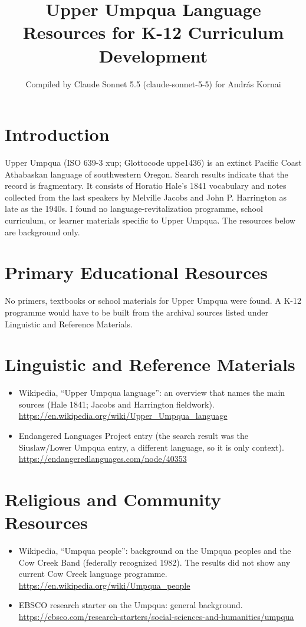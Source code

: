 \documentclass[12pt]{article}
\title{Upper Umpqua Language Resources for K-12 Curriculum Development}
\author{Compiled by Claude Sonnet 5.5 (claude-sonnet-5-5) for Andr\'as Kornai}
\date{}
\begin{document}
\maketitle

\section{Introduction}
Upper Umpqua (ISO 639-3 xup; Glottocode uppe1436) is an extinct Pacific Coast Athabaskan language of southwestern Oregon. Search results indicate that the record is fragmentary. It consists of Horatio Hale's 1841 vocabulary and notes collected from the last speakers by Melville Jacobs and John P. Harrington as late as the 1940s. I found no language-revitalization programme, school curriculum, or learner materials specific to Upper Umpqua. The resources below are background only.

\section{Primary Educational Resources}
No primers, textbooks or school materials for Upper Umpqua were found. A K-12 programme would have to be built from the archival sources listed under Linguistic and Reference Materials.

\section{Linguistic and Reference Materials}
\begin{itemize}
\item Wikipedia, ``Upper Umpqua language'': an overview that names the main sources (Hale 1841; Jacobs and Harrington fieldwork). \url{https://en.wikipedia.org/wiki/Upper_Umpqua_language}
\item Endangered Languages Project entry (the search result was the Siuslaw/Lower Umpqua entry, a different language, so it is only context). \url{https://endangeredlanguages.com/node/40353}
\end{itemize}

\section{Religious and Community Resources}
\begin{itemize}
\item Wikipedia, ``Umpqua people'': background on the Umpqua peoples and the Cow Creek Band (federally recognized 1982). The results did not show any current Cow Creek language programme. \url{https://en.wikipedia.org/wiki/Umpqua_people}
\item EBSCO research starter on the Umpqua: general background. \url{https://ebsco.com/research-starters/social-sciences-and-humanities/umpqua}
\end{itemize}
\end{document}
